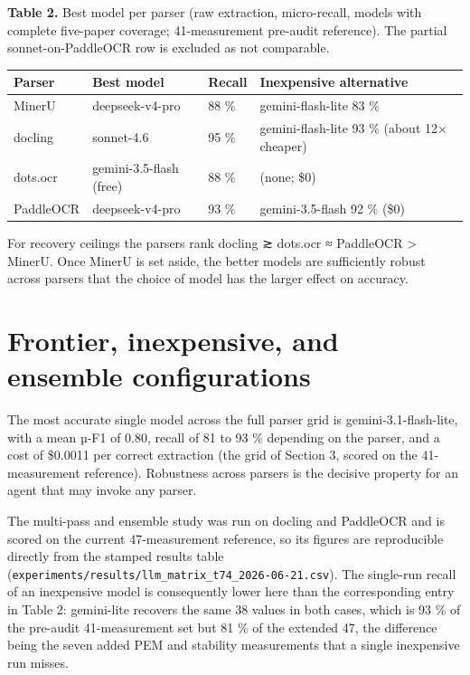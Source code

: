 \textbf{Table 2.} Best model per parser (raw extraction, micro-recall,
models with complete five-paper coverage; 41-measurement pre-audit
reference). The partial sonnet-on-PaddleOCR row is excluded as not
comparable.

\begin{longtable}[]{@{}L{0.12}L{0.23}L{0.10}L{0.45}@{}}
\toprule\noalign{}
Parser & Best model & Recall & Inexpensive alternative \\
\midrule\noalign{}
\endhead
\bottomrule\noalign{}
\endlastfoot
MinerU & deepseek-v4-pro & 88 \% & gemini-flash-lite 83 \% \\
docling & sonnet-4.6 & 95 \% & gemini-flash-lite 93 \% (about 12×
cheaper) \\
dots.ocr & gemini-3.5-flash (free) & 88 \% & (none; \$0) \\
PaddleOCR & deepseek-v4-pro & 93 \% & gemini-3.5-flash 92 \% (\$0) \\
\end{longtable}

For recovery ceilings the parsers rank docling ≳ dots.ocr ≈ PaddleOCR
\textgreater{} MinerU. Once MinerU is set aside, the better models are
sufficiently robust across parsers that the choice of model has the
larger effect on accuracy.

\section{Frontier, inexpensive, and ensemble
configurations}\label{frontier-inexpensive-and-ensemble-configurations}

The most accurate single model across the full parser grid is
gemini-3.1-flash-lite, with a mean µ-F1 of 0.80, recall of 81 to 93 \%
depending on the parser, and a cost of \$0.0011 per correct extraction
(the grid of Section 3, scored on the 41-measurement reference).
Robustness across parsers is the decisive property for an agent that may
invoke any parser.

The multi-pass and ensemble study was run on docling and PaddleOCR and is
scored on the current 47-measurement reference, so its figures are
reproducible directly from the stamped results table
(\texttt{experiments/results/llm\_matrix\_t74\_2026-06-21.csv}). The
single-run recall of an inexpensive model is consequently lower here than
the corresponding entry in Table 2: gemini-lite recovers the same 38
values in both cases, which is 93 \% of the pre-audit 41-measurement set
but 81 \% of the extended 47, the difference being the seven added PEM and
stability measurements that a single inexpensive run misses.

